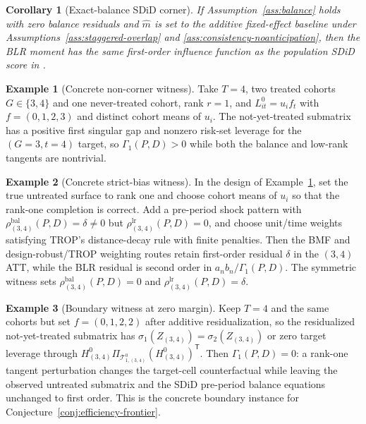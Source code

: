 \documentclass[11pt]{article}
\newcommand{\transpose}{\mathsf{T}}
\theoremstyle{definition}
\newtheorem{example}{Example}
\theoremstyle{plain}
\newtheorem{corollary}{Corollary}
\theoremstyle{remark}
\begin{document}
\begin{corollary}[Exact-balance SDiD corner]\label{cor:sdid-corner}
If Assumption~\ref{ass:balance} holds with zero balance residuals and
$\widehat m$ is set to the additive fixed-effect baseline under
Assumptions~\ref{ass:staggered-overlap} and
\ref{ass:consistency-noanticipation}, then the BLR moment has the same
first-order influence function as the population SDiD score in
\citet{ArkhangelskyAtheyHirshbergImbensWager2021}.
\end{corollary}

\begin{example}[Concrete non-corner witness]\label{ex:witness}
Take $T=4$, two treated cohorts $G\in\{3,4\}$ and one never-treated cohort,
rank $r=1$, and $L^0_{it}=u_i f_t$ with
$f=(0,1,2,3)$ and distinct cohort means of $u_i$. The not-yet-treated submatrix
has a positive first singular gap and nonzero risk-set leverage for the
$(G=3,t=4)$ target, so $\Gamma_1(P,D)>0$ while both the balance and low-rank
tangents are nontrivial.
\end{example}

\begin{example}[Concrete strict-bias witness]\label{ex:strict-bias-witness}
In the design of Example~\ref{ex:witness}, set the true untreated surface to
rank one and choose cohort means of $u_i$ so that the rank-one completion is
correct. Add a pre-period shock pattern with
$\rho^{\mathrm{bal}}_{(3,4)}(P,D)=\delta\neq 0$ but
$\rho^{\mathrm{lr}}_{(3,4)}(P,D)=0$, and choose unit/time weights satisfying
TROP's distance-decay rule with finite penalties. Then the BMF and
design-robust/TROP weighting routes retain first-order residual $\delta$ in
the $(3,4)$ ATT, while the BLR residual is second order in
$a_nb_n/\Gamma_1(P,D)$. The symmetric witness sets
$\rho^{\mathrm{bal}}_{(3,4)}(P,D)=0$ and
$\rho^{\mathrm{lr}}_{(3,4)}(P,D)=\delta$.
\end{example}

\begin{example}[Boundary witness at zero margin]\label{ex:boundary-witness}
Keep $T=4$ and the same cohorts but set $f=(0,1,2,2)$ after additive
residualization, so the residualized not-yet-treated submatrix has
$\sigma_1(Z_{(3,4)})=\sigma_2(Z_{(3,4)})$ or zero target leverage through
$H^0_{(3,4)}\Pi_{\mathcal T^0_{1,(3,4)}}(H^0_{(3,4)})^\transpose$. Then
$\Gamma_1(P,D)=0$: a rank-one tangent perturbation changes the target-cell
counterfactual while leaving the observed untreated submatrix and the SDiD
pre-period balance equations unchanged to first order. This is the concrete
boundary instance for Conjecture~\ref{conj:efficiency-frontier}.
\end{example}
\end{document}

